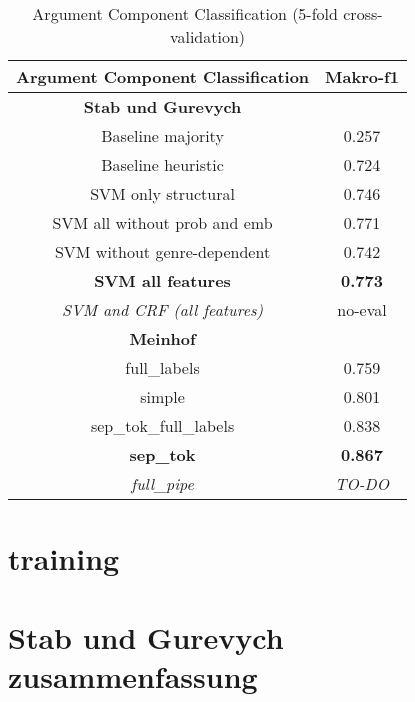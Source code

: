 \documentclass[12]{article}
\newcommand\T{\rule{0pt}{3.6ex}}       %
\newcommand\I{\rule[-1.25ex]{0pt}{0pt}} %
\newcommand\B{\rule[-1.8ex]{0pt}{0pt}} %
\theoremstyle{mytheoremstyle}
\theoremstyle{mytheoremstyle}
\theoremstyle{myproblemstyle}
\begin{document}
  \begin{table}[!h]
    \centering
    \begin{tabular}{c|c}
      \large\textbf{Argument Component Classification} &  \large\textbf{Makro-f1}\\
      \hline
      \hline
      \textbf{Stab und Gurevych} & \T \I \\
      Baseline majority & 0.257\\
      Baseline heuristic & 0.724\\
      SVM only structural & 0.746\\
      SVM all without prob and emb & 0.771\\
      SVM without genre-dependent & 0.742\\
      \textbf{SVM all features} & \textbf{0.773}\\
      \textit{SVM and CRF (all features)} & no-eval \B \\
      \hline
      \textbf{Meinhof} & \T \I \\
      full\_labels & 0.759\\
      simple & 0.801\\
      sep\_tok\_full\_labels & 0.838\\
      \textbf{sep\_tok} & \textbf{0.867}\\
      \textit{full\_pipe} & \textit{TO-DO} \B \\

    \end{tabular}
    \caption{Argument Component Classification (5-fold cross-validation)}
    \label{tab:my_label}
  \end{table}

  \section{training\dotfill}
  \section{Stab und Gurevych zusammenfassung\dotfill}
\end{document}
